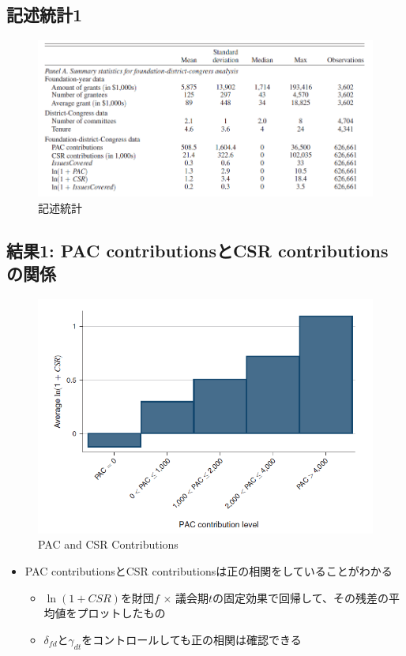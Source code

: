 \documentclass[../root]{subfiles}
\begin{document}
    \subsection{記述統計1}\label{ux8a18ux8ff0ux7d71ux8a081}

    \begin{figure}
    \centering
    \includegraphics[width = .8\linewidth]{0911kato/92602660-64c2a100-f2e9-11ea-8ec8-7535de579a5d.png}
    \caption{記述統計}
    \end{figure}

    \subsection{結果1: PAC contributionsとCSR contributionsの関係}\label{ux7d50ux679c1-pac-contributionsux3068csr-contributionsux306eux95a2ux4fc2}

    \begin{figure}
    \centering
    \includegraphics[width = .8\linewidth]{0911kato/92603528-5f198b00-f2ea-11ea-848f-dbf2ca9d349b.png}
    \caption{PAC and CSR Contributions}
    \end{figure}

    \begin{itemize}
    
    \item
      PAC contributionsとCSR contributionsは正の相関をしていることがわかる

      \begin{itemize}
      
      \item
        \(\ln(1 + CSR)\)を財団\(f\) \(\times\) 議会期\(t\)の固定効果で回帰して、その残差の平均値をプロットしたもの
      \item
        \(\delta_{fd}\)と\(\gamma_{dt}\)をコントロールしても正の相関は確認できる
      \end{itemize}
    \end{itemize}
\end{document}
